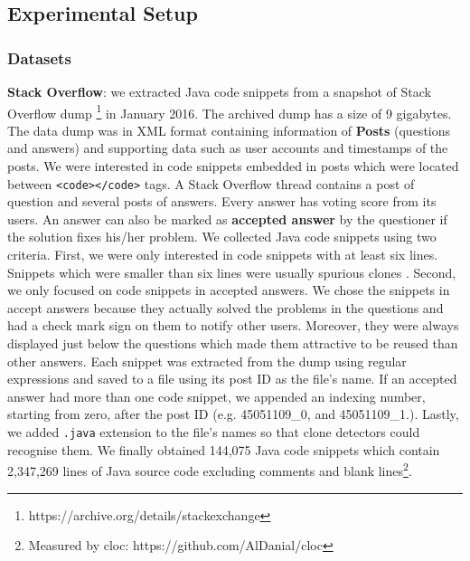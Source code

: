 \documentclass[sigconf,review, anonymous]{acmart}
\begin{document}
\subsection{Experimental Setup}

\subsubsection{Datasets}

\textbf{Stack Overflow}: we extracted Java code snippets from a snapshot of Stack Overflow dump \footnote{https://archive.org/details/stackexchange} in January 2016. The archived dump has a size of 9 gigabytes. The data dump was in XML format containing information of \textbf{Posts} (questions and answers) and supporting data such as user accounts and timestamps of the posts. We were interested in code snippets embedded in posts which were located between {\small\texttt{<code></code>}} tags. A Stack Overflow thread contains a post of question and several posts of answers. Every answer has voting score from its users. An answer can also be marked as \textbf{accepted answer} by the questioner if the solution fixes his/her problem. We collected Java code snippets using two criteria. First, we were only interested in code snippets with at least six lines. Snippets which were smaller than six lines were usually spurious clones \cite{Bellon2007}. Second, we only focused on code snippets in accepted answers. We chose the snippets in accept answers because they actually solved the problems in the questions and had a check mark sign on them to notify other users. Moreover, they were always displayed just below the questions which made them attractive to be reused than other answers. Each snippet was extracted from the dump using regular expressions and saved to a file using its post ID as the file's name. If an accepted answer had more than one code snippet, we appended an indexing number, starting from zero, after the post ID (e.g. 45051109\_0, and 45051109\_1.). Lastly, we added {\small\texttt{.java}} extension to the file's names so that clone detectors could recognise them. We finally obtained 144,075 Java code snippets which contain 2,347,269 lines of Java source code excluding comments and blank lines\footnote{Measured by cloc: https://github.com/AlDanial/cloc}.
\end{document}
